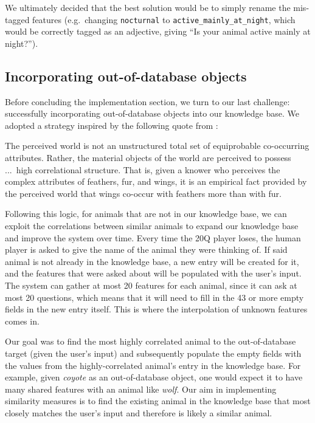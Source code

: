 \documentclass[11pt,a4paper]{article}
\begin{document}
We ultimately decided that the best solution would be to simply rename the mis-tagged features (e.g.\ changing \texttt{nocturnal} to \texttt{active\_mainly\_at\_night}, which would be correctly tagged as an adjective, giving ``Is your animal active mainly at night?'').

\subsection{Incorporating out-of-database objects}
\label{subsec:out-of-db}

Before concluding the implementation section, we turn to our last challenge: successfully incorporating out-of-database objects into our knowledge base. 
We adopted a strategy inspired by the following quote from \citet[29]{Rosch1978}:

\begin{displayquote}
The perceived world is not an unstructured total set of equiprobable co-occurring attributes. 
Rather, the material objects of the world are perceived to possess ...\ high correlational structure.
That is, given a knower who perceives the complex attributes of feathers, fur, and wings, it is an empirical fact provided by the perceived world that wings co-occur with feathers more than with fur. 
\end{displayquote}

Following this logic, for animals that are not in our knowledge base, we can exploit the correlations between similar animals to expand our knowledge base and improve the system over time.
Every time the 20Q player loses, the human player is asked to give the name of the animal they were thinking of. 
If said animal is not already in the knowledge base, a new entry will be created for it, and the features that were asked about will be populated with the user's input. 
The system can gather at most 20 features for each animal, since it can ask at most 20 questions, which means that it will need to fill in the 43 or more empty fields in the new entry itself.
This is where the interpolation of unknown features comes in.

Our goal was to find the most highly correlated animal to the out-of-database target (given the user's input) and subsequently populate the empty fields with the values from the highly-correlated animal's entry in the knowledge base. 
For example, given \textit{coyote} as an out-of-database object, one would expect it to have many shared features with an animal like \textit{wolf}. 
Our aim in implementing similarity measures is to find the existing animal in the knowledge base that most closely matches the user's input and therefore is likely a similar animal.
\end{document}
